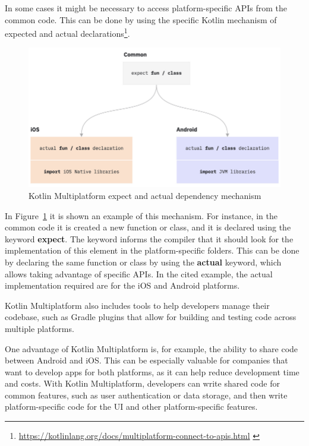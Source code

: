 In some cases it might be necessary to access platform-specific APIs from the common code. This can be done by using the specific Kotlin mechanism of expected and actual declarations\footnote{\url{https://kotlinlang.org/docs/multiplatform-connect-to-apis.html} \label{expect_actual_footnote}}.\newline
\begin{figure}[!ht]
    \centering
    \includegraphics[scale=0.85]{document/chapters/4-collektive/images/km_expect_actual.png}
    \caption{Kotlin Multiplatform expect and actual dependency mechanism}
    \label{fig:km_expect_actual}
\end{figure}
In Figure~\ref{fig:km_expect_actual} it is shown an example of this mechanism. For instance, in the common code it is created a new function or class, and it is declared using the keyword \textbf{expect}. The keyword informs the compiler that it should look for the implementation of this element in the platform-specific folders. This can be done by declaring the same function or class by using the \textbf{actual} keyword, which allows taking advantage of specific APIs. In the cited example, the actual implementation required are for the iOS and Android platforms.

Kotlin Multiplatform also includes tools to help developers manage their codebase, such as Gradle plugins that allow for building and testing code across multiple platforms.

One advantage of Kotlin Multiplatform is, for example, the ability to share code between Android and iOS. This can be especially valuable for companies that want to develop apps for both platforms, as it can help reduce development time and costs. With Kotlin Multiplatform, developers can write shared code for common features, such as user authentication or data storage, and then write platform-specific code for the UI and other platform-specific features.

